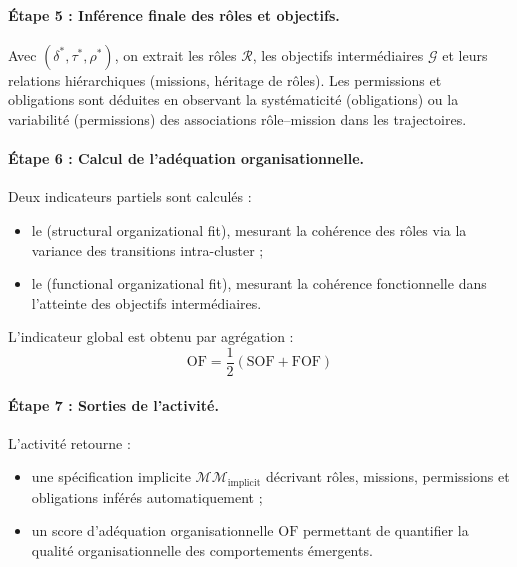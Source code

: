 \paragraph{Étape 5 : Inférence finale des rôles et objectifs.}
Avec $(\delta^*, \tau^*, \rho^*)$, on extrait les rôles $\mathcal{R}$, les objectifs intermédiaires $\mathcal{G}$ et leurs relations hiérarchiques (missions, héritage de rôles).
Les permissions et obligations sont déduites en observant la systématicité (obligations) ou la variabilité (permissions) des associations rôle–mission dans les trajectoires.

\paragraph{Étape 6 : Calcul de l'adéquation organisationnelle.}
Deux indicateurs partiels sont calculés :
\begin{itemize}
  \item le \textbf{} (structural organizational fit), mesurant la cohérence des rôles via la variance des transitions intra-cluster ;
  \item le \textbf{} (functional organizational fit), mesurant la cohérence fonctionnelle dans l'atteinte des objectifs intermédiaires.
\end{itemize}
L'indicateur global est obtenu par agrégation :
\[
  \text{OF} = \frac{1}{2}(\text{SOF} + \text{FOF})
\]

\paragraph{Étape 7 : Sorties de l'activité.}
L'activité retourne :
\begin{itemize}
  \item une spécification implicite $\mathcal{MM}_{\text{implicit}}$ décrivant rôles, missions, permissions et obligations inférés automatiquement ;
  \item un score d'adéquation organisationnelle $\text{OF}$ permettant de quantifier la qualité organisationnelle des comportements émergents.
\end{itemize}


